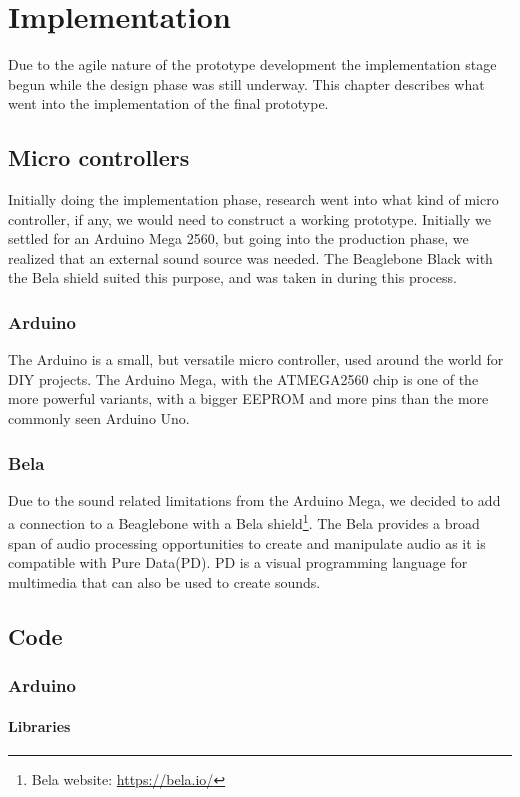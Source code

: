 \chapter{Implementation}%
Due to the agile nature of the prototype development the implementation stage begun while the design phase was still underway. This chapter describes what went into the implementation of the final prototype.

\section{Micro controllers}%
	Initially doing the implementation phase, research went into what kind of micro controller, if any, we would need to construct a working prototype. Initially we settled for an Arduino Mega 2560, but going into the production phase, we realized that an external sound source was needed. The Beaglebone Black with the Bela shield suited this purpose, and was taken in during this process.
	\subsection{Arduino}%
		The Arduino is a small, but versatile micro controller, used around the world for DIY projects. The Arduino Mega, with the ATMEGA2560 chip is one of the more powerful variants, with a bigger EEPROM and more pins than the more commonly seen Arduino Uno. 
		
	\subsection{Bela}%
		Due to the sound related limitations from the Arduino Mega, we decided to add a connection to a Beaglebone with a Bela shield\footnote{Bela website: \url{https://bela.io/}}. The Bela provides a broad span of audio processing opportunities to create and manipulate audio as it is compatible with Pure Data(PD). PD is a visual programming language for multimedia that can also be used to create sounds.
		
	
\section{Code}
	\subsection{Arduino}%
		\subsubsection{Libraries}%
